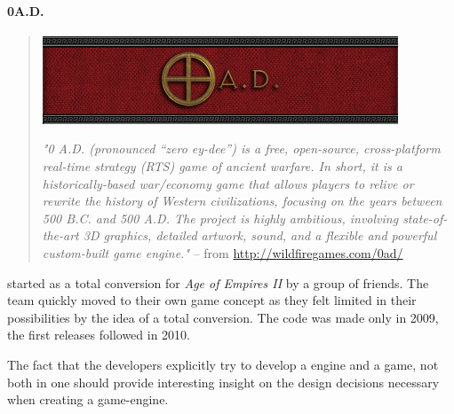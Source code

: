 \paragraph{0A.D.}
\begin{quote}
\begin{center}\includegraphics[scale=0.8]{pics/0ad}\end{center}
\textit{"0 A.D. (pronounced “zero ey-dee”) is a free, open-source, cross-platform real-time strategy (RTS) game of
ancient warfare. In short, it is a historically-based war/economy game that allows players to relive or rewrite the
history of Western civilizations, focusing on the years between 500 B.C. and 500 A.D. The project is highly ambitious,
involving state-of-the-art 3D graphics, detailed artwork, sound, and a flexible and powerful custom-built game engine."}
-- from \url{http://wildfiregames.com/0ad/}
\end{quote}

\AD{} started as a total conversion for \textit{Age of Empires II} by a group of friends. The team quickly moved to
their own game concept as they felt limited in their possibilities by the idea of a total conversion. The code was made
\OS{} only in 2009, the first releases followed in 2010.

The fact that the developers explicitly try to develop a engine and a game, not both in one should provide interesting
insight on the design decisions necessary when creating a game-engine.






